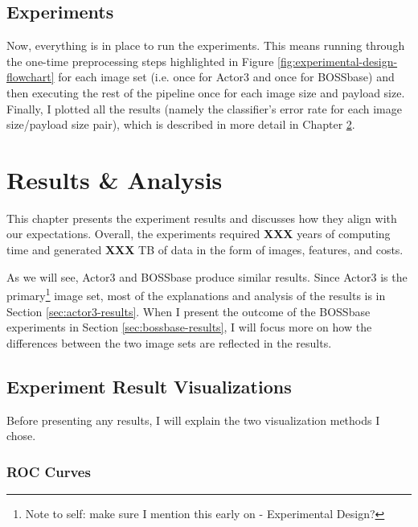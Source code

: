 \documentclass[11pt,a4paper,twoside,openright]{report}
\begin{document}
\section{Experiments}

Now, everything is in place to run the experiments. This means running through the one-time preprocessing steps highlighted in Figure \ref{fig:experimental-design-flowchart} for each image set (i.e. once for Actor3 and once for BOSSbase) and then executing the rest of the pipeline once for each image size and payload size. Finally, I plotted all the results (namely the classifier's error rate for each image size/payload size pair), which is described in more detail in Chapter \ref{chap:results}.



\chapter{Results \& Analysis} \label{chap:results}

This chapter presents the experiment results and discusses how they align with our expectations. Overall, the experiments required \textbf{XXX} years of computing time and generated \textbf{XXX} TB of data in the form of images, features, and costs.

As we will see, Actor3 and BOSSbase produce similar results. Since Actor3 is the primary\footnote{Note to self: make sure I mention this early on - Experimental Design?} image set, most of the explanations and analysis of the results is in Section \ref{sec:actor3-results}. When I present the outcome of the BOSSbase experiments in Section \ref{sec:bossbase-results}, I will focus more on how the differences between the two image sets are reflected in the results.


\section{Experiment Result Visualizations}

Before presenting any results, I will explain the two visualization methods I chose.


\subsection{ROC Curves} \label{sec:roc-curves}
\end{document}
